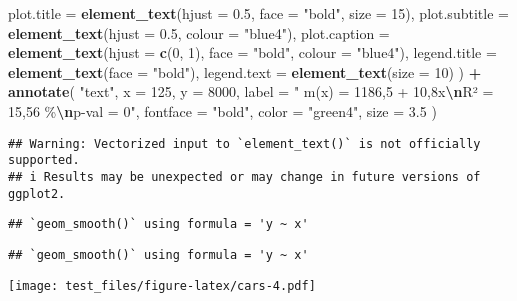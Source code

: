 \documentclass[
]{article}
\newenvironment{Shaded}{\begin{snugshade}}{\end{snugshade}}
\newcommand{\AttributeTok}[1]{\textcolor[rgb]{0.13,0.29,0.53}{#1}}
\newcommand{\CommentTok}[1]{\textcolor[rgb]{0.56,0.35,0.01}{\textit{#1}}}
\newcommand{\DecValTok}[1]{\textcolor[rgb]{0.00,0.00,0.81}{#1}}
\newcommand{\FloatTok}[1]{\textcolor[rgb]{0.00,0.00,0.81}{#1}}
\newcommand{\FunctionTok}[1]{\textcolor[rgb]{0.13,0.29,0.53}{\textbf{#1}}}
\newcommand{\NormalTok}[1]{#1}
\newcommand{\SpecialCharTok}[1]{\textcolor[rgb]{0.81,0.36,0.00}{\textbf{#1}}}
\newcommand{\StringTok}[1]{\textcolor[rgb]{0.31,0.60,0.02}{#1}}
\begin{document}
\begin{Shaded}
\begin{Highlighting}[]
    \AttributeTok{plot.title =} \FunctionTok{element\_text}\NormalTok{(}\AttributeTok{hjust =} \FloatTok{0.5}\NormalTok{, }\AttributeTok{face =} \StringTok{"bold"}\NormalTok{, }\AttributeTok{size =} \DecValTok{15}\NormalTok{),}
    \AttributeTok{plot.subtitle =} \FunctionTok{element\_text}\NormalTok{(}\AttributeTok{hjust =} \FloatTok{0.5}\NormalTok{, }\AttributeTok{colour =} \StringTok{"blue4"}\NormalTok{),}
    \AttributeTok{plot.caption =} \FunctionTok{element\_text}\NormalTok{(}\AttributeTok{hjust =} \FunctionTok{c}\NormalTok{(}\DecValTok{0}\NormalTok{, }\DecValTok{1}\NormalTok{), }\AttributeTok{face =} \StringTok{"bold"}\NormalTok{, }\AttributeTok{colour =} \StringTok{"blue4"}\NormalTok{),}
    \AttributeTok{legend.title =} \FunctionTok{element\_text}\NormalTok{(}\AttributeTok{face =} \StringTok{"bold"}\NormalTok{),  }
    \AttributeTok{legend.text =} \FunctionTok{element\_text}\NormalTok{(}\AttributeTok{size =} \DecValTok{10}\NormalTok{)  }
\NormalTok{  ) }\SpecialCharTok{+}
  \FunctionTok{annotate}\NormalTok{(}
    \StringTok{"text"}\NormalTok{, }
    \AttributeTok{x =} \DecValTok{125}\NormalTok{, }
    \AttributeTok{y =} \DecValTok{8000}\NormalTok{, }
    \AttributeTok{label =} \StringTok{" m(x) = 1186,5 + 10,8x}\SpecialCharTok{\textbackslash{}n}\StringTok{R² = 15,56 \%}\SpecialCharTok{\textbackslash{}n}\StringTok{p{-}val = 0"}\NormalTok{, }
    \AttributeTok{fontface =} \StringTok{"bold"}\NormalTok{,}
    \AttributeTok{color =} \StringTok{"green4"}\NormalTok{, }
    \AttributeTok{size =} \FloatTok{3.5}
\NormalTok{  )}
\end{Highlighting}
\end{Shaded}

\begin{verbatim}
## Warning: Vectorized input to `element_text()` is not officially supported.
## i Results may be unexpected or may change in future versions of ggplot2.
\end{verbatim}

\begin{verbatim}
## `geom_smooth()` using formula = 'y ~ x'
\end{verbatim}

\begin{verbatim}
## `geom_smooth()` using formula = 'y ~ x'
\end{verbatim}

\texttt{[image: test\_files/figure-latex/cars-4.pdf]}

\begin{Shaded}
\end{Shaded}
\end{document}
